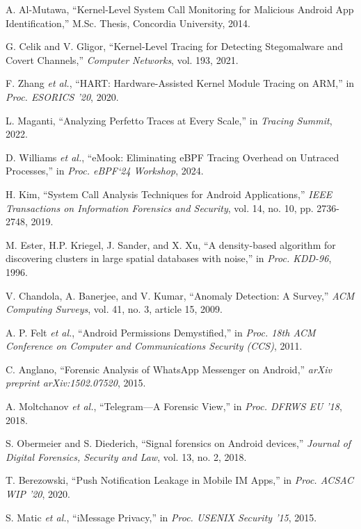 \documentclass[a4paper,12pt]{report}
\begin{document}
\begin{thebibliography}{99}
A. Al-Mutawa, “Kernel-Level System Call Monitoring for Malicious Android App Identification,” M.Sc. Thesis, Concordia University, 2014.

G. Celik and V. Gligor, “Kernel-Level Tracing for Detecting Stegomalware and Covert Channels,” \emph{Computer Networks}, vol. 193, 2021.

F. Zhang \emph{et al.}, “HART: Hardware-Assisted Kernel Module Tracing on ARM,” in \emph{Proc. ESORICS '20}, 2020.

L. Maganti, “Analyzing Perfetto Traces at Every Scale,” in \emph{Tracing Summit}, 2022.

D. Williams \emph{et al.}, “eMook: Eliminating eBPF Tracing Overhead on Untraced Processes,” in \emph{Proc. eBPF‘24 Workshop}, 2024.

H. Kim, “System Call Analysis Techniques for Android Applications,” \emph{IEEE Transactions on Information Forensics and Security}, vol. 14, no. 10, pp. 2736-2748, 2019.

M. Ester, H.P. Kriegel, J. Sander, and X. Xu, “A density-based algorithm for discovering clusters in large spatial databases with noise,” in \emph{Proc. KDD-96}, 1996.

V. Chandola, A. Banerjee, and V. Kumar, “Anomaly Detection: A Survey,” \emph{ACM Computing Surveys}, vol. 41, no. 3, article 15, 2009.

A. P. Felt \emph{et al.}, “Android Permissions Demystified,” in \emph{Proc. 18th ACM Conference on Computer and Communications Security (CCS)}, 2011.

C. Anglano, “Forensic Analysis of WhatsApp Messenger on Android,” \emph{arXiv preprint arXiv:1502.07520}, 2015.

A. Moltchanov \emph{et al.}, “Telegram—A Forensic View,” in \emph{Proc. DFRWS EU '18}, 2018.

S. Obermeier and S. Diederich, “Signal forensics on Android devices,” \emph{Journal of Digital Forensics, Security and Law}, vol. 13, no. 2, 2018.

T. Berezowski, “Push Notification Leakage in Mobile IM Apps,” in \emph{Proc. ACSAC WIP '20}, 2020.

S. Matic \emph{et al.}, “iMessage Privacy,” in \emph{Proc. USENIX Security '15}, 2015.


\end{thebibliography}
\end{document}

